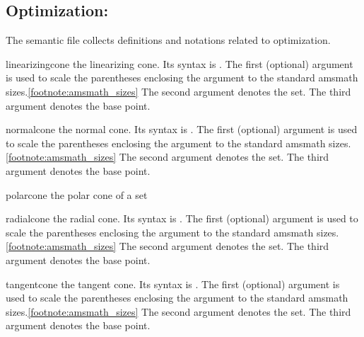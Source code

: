 \documentclass[english,a4paper,DIV=12,parskip=full,oneside]{scrartcl}
\begin{document}
\subsection{Optimization: \texorpdfstring{}{mathsemantics-optimization.sty}}\label{subsec:optimization}

The semantic file  collects definitions and notations related to optimization.
\begin{commandlist}
	\item[linearizingcone] the linearizing cone.
		Its syntax is .
		The first (optional) argument is used to scale the parentheses enclosing the argument to the standard amsmath sizes.\cref{footnote:amsmath_sizes}
		The second argument denotes the set.
		The third argument denotes the base point.
		\par{}
		\par{}
		\par{}

	\item[normalcone] the normal cone.
		Its syntax is .
		The first (optional) argument is used to scale the parentheses enclosing the argument to the standard amsmath sizes.\cref{footnote:amsmath_sizes}
		The second argument denotes the set.
		The third argument denotes the base point.
		\par{}
		\par{}
		\par{}

	\item[polarcone] the polar cone of a set 

	\item[radialcone] the radial cone.
		Its syntax is .
		The first (optional) argument is used to scale the parentheses enclosing the argument to the standard amsmath sizes.\cref{footnote:amsmath_sizes}
		The second argument denotes the set.
		The third argument denotes the base point.
		\par{}
		\par{}
		\par{}

	\item[tangentcone] the tangent cone.
		Its syntax is .
		The first (optional) argument is used to scale the parentheses enclosing the argument to the standard amsmath sizes.\cref{footnote:amsmath_sizes}
		The second argument denotes the set.
		The third argument denotes the base point.
		\par{}
		\par{}
		\par{}
\end{commandlist}
\end{document}
